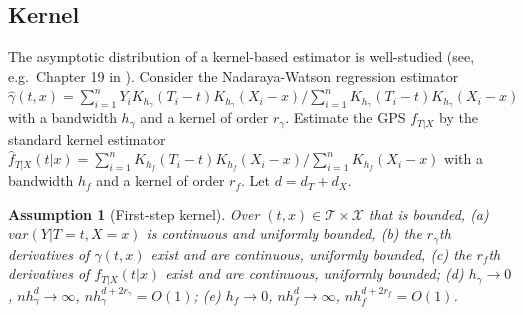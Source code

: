 \documentclass[lettersize, 12pt]{article}
\newtheorem{assumption}{Assumption}
\begin{document}
{\subsection{Kernel}
\label{SecKernelA}
The asymptotic distribution of a kernel-based estimator is well-studied (see, e.g.\ Chapter 19 in \cite{HansenBook}).
Consider the Nadaraya-Watson regression estimator $\hat\gamma(t,x) = \sum_{i=1}^n Y_i K_{h_\gamma}(T_i - t) K_{h_\gamma}(X_i - x)\big/\sum_{i=1}^n K_{h_\gamma}(T_i - t) K_{h_\gamma}(X_i - x)$ with a bandwidth $h_\gamma$ and a kernel of order $r_\gamma$. 
Estimate the GPS $f_{T|X}$ by the standard kernel estimator 
$\hat f_{T|X}(t|x) =  \sum_{i=1}^n K_{h_f}(T_i - t) K_{h_f}(X_i - x)\big/\sum_{i=1}^n K_{h_f}(X_i - x)$ with a bandwidth $h_f$ and a kernel of order $r_f$.
Let $d = d_T + d_X$.

\begin{assumption}[First-step kernel] 
Over $(t,x) \in \mathcal{T}\times\mathcal{X}$ that is bounded,
(a) $var(Y|T=t,X=x)$ is continuous and uniformly bounded,
(b) the $r_\gamma$th derivatives of $\gamma(t,x)$ exist and are continuous, uniformly bounded,
(c) the $r_f$th derivatives of $f_{T|X}(t|x)$ exist and are continuous, uniformly bounded;
(d) $h_\gamma \rightarrow 0$, $nh_\gamma^d \rightarrow\infty$, $nh_\gamma^{d+2r_\gamma} = O(1)$;
(e) $h_f \rightarrow 0$, $nh_f^d \rightarrow\infty$, $nh_f^{d+2r_f} = O(1)$.
\label{Akernel1}
\end{assumption}

}
\end{document}
